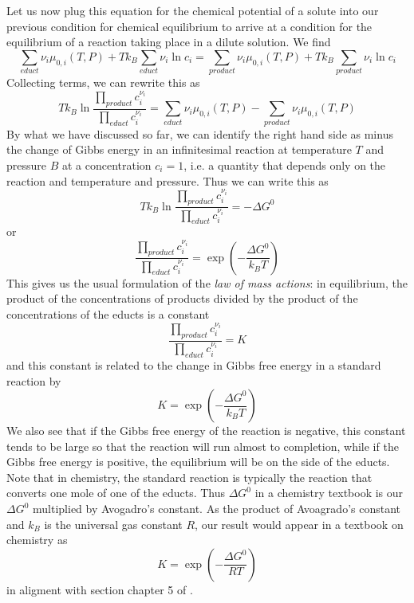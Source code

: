 \documentclass[a4paper, draft]{report}
\numberwithin{section}{chapter}
\numberwithin{equation}{chapter}
\theoremstyle{own}
\theoremstyle{remark}
\begin{document}
Let us now plug this equation for the chemical potential of a solute into our previous condition for chemical equilibrium to arrive at a condition for the equilibrium of a reaction taking place in a dilute solution. We find
$$
\sum_{educt} \nu_i \mu_{0, i}(T, P) + T k_B \sum_{educt} \nu_i \ln c_i = \sum_{product} \nu_i \mu_{0, i}(T, P) + T k_B \sum_{product} \nu_i \ln c_i
$$
Collecting terms, we can rewrite this as
$$
T k_B \ln \frac{\prod_{product} c_i^{\nu_i}}{\prod_{educt} c_i^{\nu_i}} = \sum_{educt} \nu_i \mu_{0, i}(T, P) - \sum_{product} \nu_i \mu_{0, i}(T, P)
$$
By what we have discussed so far, we can identify the right hand side as minus the change of Gibbs energy in an infinitesimal reaction at temperature $T$ and pressure $B$ at a concentration $c_i = 1$, i.e. a quantity that depends only on the reaction and temperature and pressure. Thus we can write this as
$$
T k_B \ln \frac{\prod_{product} c_i^{\nu_i}}{\prod_{educt} c_i^{\nu_i}} =  - \Delta G^0
$$
or
$$
\frac{\prod_{product} c_i^{\nu_i}}{\prod_{educt} c_i^{\nu_i}} = \exp (- \frac{\Delta G^0}{k_B T})
$$
This gives us the usual formulation of the {\em law of mass actions}: in equilibrium, the product of the concentrations of products divided by the product of the concentrations of the educts is a constant
$$
\frac{\prod_{product} c_i^{\nu_i}}{\prod_{educt} c_i^{\nu_i}} = K
$$
and this constant is related to the change in Gibbs free energy in a standard reaction by
$$
K = \exp (- \frac{\Delta G^0}{k_B T})
$$
We also see that if the Gibbs free energy of the reaction is negative, this constant tends to be large so that the reaction will run almost to completion, while if the Gibbs free energy is positive, the equilibrium will be on the side of the educts. Note that in chemistry, the standard reaction is typically the reaction that converts one mole of one of the educts. Thus  $\Delta G^0$ in a chemistry textbook is our $\Delta G^0$ multiplied by Avogadro's constant. As the product of Avoagrado's constant and $k_B$ is the universal gas constant $R$, our result would appear in a textbook on chemistry as
$$
K = \exp (- \frac{\Delta G^0}{R T})
$$
in aligment with section chapter 5 of \cite{Schroeder}. 
\end{document}
